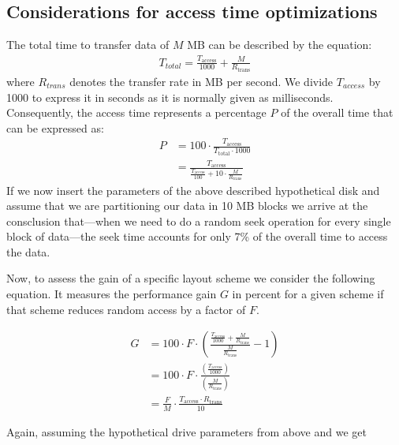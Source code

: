 
\subsection{Considerations for access time optimizations}

The total time to transfer data of $M$ MB can
be described by the equation:
\begin{align*}
  T_{total} =  \frac{T_{\text{access}}}{1000} +  \frac{M}{R_{\text{trans}}}
\end{align*}
where $R_{trans}$ denotes the transfer rate in MB per second. 
We divide $T_{access}$  by 1000 to express it in seconds as it is
normally given as milliseconds.
Consequently, the access time represents a percentage $P$ of the overall time
that can be expressed as:
\begin{align*}
P &= 100 \cdot \frac{T_{\text{access}}}{T_{\text{total}} \cdot 1000}
\\&=  \frac{T_{\text{access}}} {\frac{T_{\text{access}}}{100} +  10 \cdot \frac{M}{R_{\text{trans}}}}
\end{align*}
If we now insert the parameters of the above described hypothetical
disk and assume that we are partitioning our data in 10 MB blocks we
arrive at the consclusion that---when we need to do a random seek
operation for every single block of data---the seek time accounts for
only 7\% of the overall time to access the data.

Now, to assess the gain of a specific layout scheme we consider the following 
equation. It measures the performance gain $G$ in percent for a given scheme if that scheme reduces 
random access by a factor of $F$.

\begin{align*}
G  &= 100 \cdot F \cdot \left( \frac{ \frac{T_{\text{access}}}{1000} + \frac{M}{R_{\text{trans}}} }{\frac{M}{R_{\text{trans}}}}- 1\right)
\\ &= 100 \cdot F \cdot \frac{ \left(\frac{ T_{\text{access}} } {1000}\right)}   { \left(\frac{M}{R_{\text{trans}}}\right)}
\\ &=  \frac{F}{M} \cdot \frac{T_{\text{access}} \cdot {R_{\text{trans}}}  }   { 10 }
\end{align*}

Again, assuming the hypothetical drive parameters from above and we get

